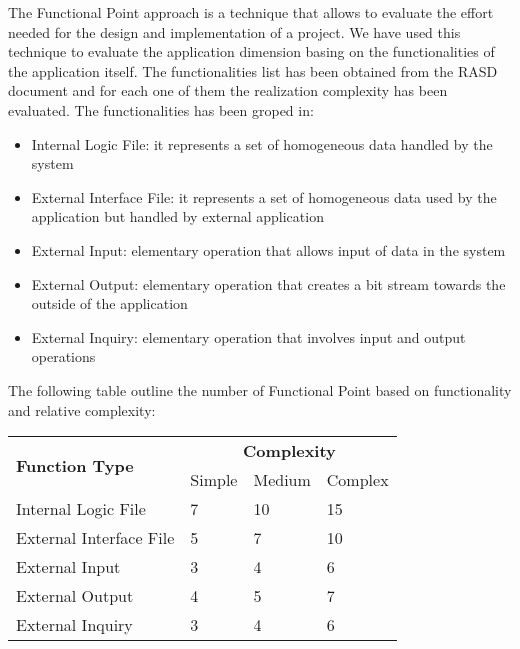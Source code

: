 The Functional Point approach is a technique that allows to evaluate the effort
needed for the design and implementation of a project. We have used this technique
to evaluate the application dimension basing on the functionalities of the
application itself. The functionalities list has been obtained from the RASD document
and for each one of them the realization complexity has been evaluated.
The functionalities has been groped in:
\begin{itemize}
\item Internal Logic File: it represents a set of homogeneous data handled by the system
\item External Interface File: it represents a set of homogeneous data used
by the application but handled by external application
\item External Input: elementary operation that allows input of data in the system
\item External Output: elementary operation that creates a bit stream towards
the outside of the application
\item External Inquiry: elementary operation that involves input and output operations 
\end{itemize}

\newpage

The following table outline the number of Functional Point based on functionality
and relative complexity:

\begin{table}[h]
	\centering
	\begin{tabular}{| l | l | l | l |}
		\hline
		\multirow{2}{*}{\textbf{Function Type}} & \multicolumn{3}{c|}{\textbf{Complexity}} \\
		\cline{2-4}
		& Simple & Medium & Complex  \\
		\hline
		Internal Logic File & 7 & 10 & 15 \\ \hline
		External Interface File & 5 & 7 & 10 \\ \hline
		External Input & 3 & 4 & 6 \\ \hline
		External Output & 4 & 5 & 7 \\ \hline
		External Inquiry & 3 & 4 & 6 \\ \hline	
		
	\end{tabular}
\end{table}

